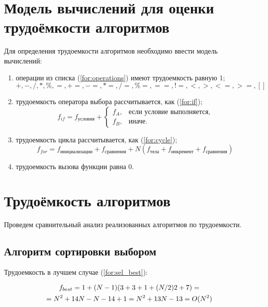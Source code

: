 \section{Модель вычислений для оценки трудоёмкости алгоритмов}

Для определения трудоемкости алгоритмов необходимо ввести модель вычислений:

\begin{enumerate}
	\item операции из списка (\ref{for:operations}) имеют трудоемкость равную 1;
	\begin{equation}
		\label{for:operations}
		+, -, /, *, \%, =, +=, -=, *=, /=, \%=, ==, !=, <, >, <=, >=, []
	\end{equation}
	\item трудоемкость оператора выбора  рассчитывается, как (\ref{for:if});
	\begin{equation}
		\label{for:if}
		f_{if} = f_{\text{условия}} +
		\begin{cases}
			f_A, & \text{если условие выполняется,}\\
			f_B, & \text{иначе.}
		\end{cases}
	\end{equation}
	\item трудоемкость цикла рассчитывается, как (\ref{for:cycle});
	\begin{equation}
		\label{for:cycle}
		f_{for} = f_{\text{инициализации}} + f_{\text{сравнения}} + N(f_{\text{тела}} + f_{\text{инкремент}} + f_{\text{сравнения}})
	\end{equation}
	\item трудоемкость вызова функции равна 0.
\end{enumerate}

\section{Трудоёмкость алгоритмов}

Проведем сравнительный анализ реализованных алгоритмов по трудоемкости.

\subsection{Алгоритм сортировки выбором}

Трудоемкость в лучшем случае (\ref{for:sel_best}):

\begin{gather}
	\label{for:sel_best}
	f_{best} = 1 + (N - 1)(3 + 3 + 1 + (N / 2)2 + 7) = \\ \notag
	= N^2 + 14N - N - 14 + 1 = N^2 + 13N - 13  = O(N^2)
\end{gather}

